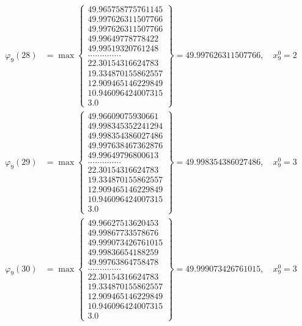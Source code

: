 \documentclass{article}
\begin{document}
\begin{align*}
  
  
  
\varphi_{9}(28) &= \max \left\{ \begin{array}{c}
49.965758775761145 \\
 49.997626311507766 \\
 49.997626311507766 \\
 49.99649778778422 \\
 49.99519320761248 \\
 .............. \\
 22.30154316624783 \\
 19.334870155862557 \\
 12.909465146229849 \\
 10.946096424007315 \\
 3.0
\end{array} \right\} = 49.997626311507766, \quad x_{9}^0 = 2\\
  
  
  
  
\varphi_{9}(29) &= \max \left\{ \begin{array}{c}
49.96609075930661 \\
 49.998345352241294 \\
 49.998354386027486 \\
 49.997638467362876 \\
 49.99649796800613 \\
 .............. \\
 22.30154316624783 \\
 19.334870155862557 \\
 12.909465146229849 \\
 10.946096424007315 \\
 3.0
\end{array} \right\} = 49.998354386027486, \quad x_{9}^0 = 3\\
  
  
  
  
\varphi_{9}(30) &= \max \left\{ \begin{array}{c}
49.96627513620453 \\
 49.99867733578676 \\
 49.999073426761015 \\
 49.99836654188259 \\
 49.99763864758478 \\
 .............. \\
 22.30154316624783 \\
 19.334870155862557 \\
 12.909465146229849 \\
 10.946096424007315 \\
 3.0
\end{array} \right\} = 49.999073426761015, \quad x_{9}^0 = 3\\
  

\end{align*}
\end{document}
